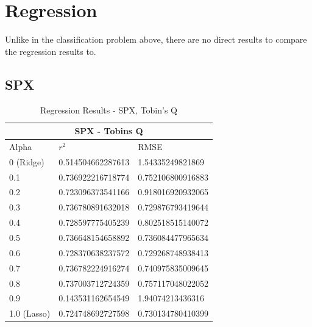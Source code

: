 \clearpage
\section{Regression}\label{S.regression4}
{Unlike in the classification problem above, there are no direct results to compare the regression results to.}


\subsection{SPX}
\begin{table}[h!]
\centering
\begin{tabular}{ |p{2.5cm}||p{4cm}|p{4cm}| }
 \hline
 \multicolumn{3}{|c|}{SPX - Tobins Q} \\
 \hline
 Alpha & $r^2$ & RMSE \\
 \hline
 0 (Ridge) & 0.514504662287613 & 1.54335249821869 \\          
0.1 & 0.736922216718774 & 0.752106800916883\\
0.2 & 0.723096373541166 & 0.918016920932065\\
0.3 & 0.736780891632018 & 0.729876793419644\\
0.4 & 0.728597775405239 & 0.802518515140072\\
0.5 & 0.736648154658892 & 0.736084477965634\\
0.6 & 0.728370638237572 & 0.729268748938413\\
0.7 & 0.736782224916274 & 0.740975835009645\\
\rowcolor{gray}0.8 & 0.737003712724359 & 0.757117048022052\\
0.9 & 0.143531162654549 & 1.94074213436316\\
1.0 (Lasso) & 0.724748692727598 & 0.730134780410399 \\
 \hline
\end{tabular}
\caption{Regression Results  - SPX, Tobin's Q}
\end{table}


